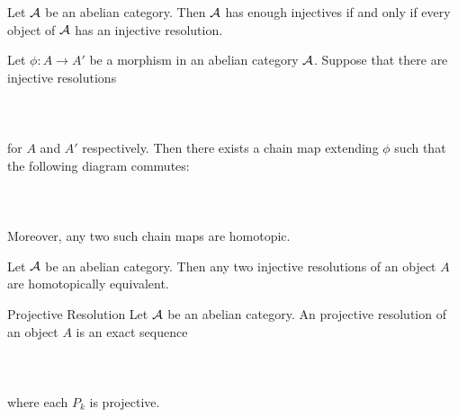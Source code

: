 \documentclass[a4paper]{article}
\begin{document}
\begin{prp}{}{} Let $\mathcal{A}$ be an abelian category. Then $\mathcal{A}$ has enough injectives if and only if every object of $\mathcal{A}$ has an injective resolution. 
\end{prp}

\begin{prp}{}{} Let $\phi:A\to A'$ be a morphism in an abelian category $\mathcal{A}$. Suppose that there are injective resolutions \\~\\
\\~\\
for $A$ and $A'$ respectively. Then there exists a chain map extending $\phi$ such that the following diagram commutes: \\~\\
\\~\\
Moreover, any two such chain maps are homotopic. 
\end{prp}

\begin{lmm}{}{} Let $\mathcal{A}$ be an abelian category. Then any two injective resolutions of an object $A$ are homotopically equivalent. 
\end{lmm}

\begin{defn}{Projective Resolution}{} Let $\mathcal{A}$ be an abelian category. An projective resolution of an object $A$ is an exact sequence \\~\\
\\~\\
where each $P_k$ is projective. 
\end{defn}
\end{document}
